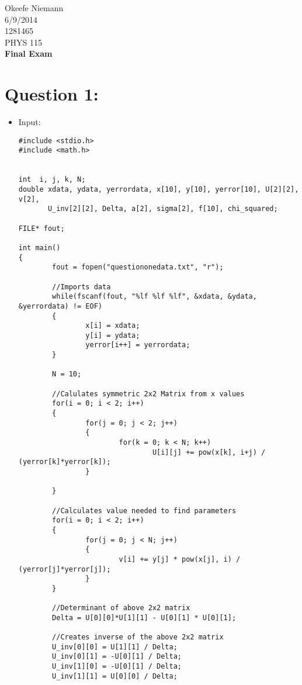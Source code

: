 \documentclass[10pt]{article}
\begin{document}
 
\begin{center}
\large
\hfill Okeefe Niemann\\
\hfill 6/9/2014\\
\hfill 1281465\\
\hfill PHYS 115 \\
\LARGE \textbf{Final Exam}\\
\end{center}
\normalsize
\section*{Question 1:}
\begin{itemize}
\item Input:
\begin{verbatim}
#include <stdio.h>
#include <math.h>


int  i, j, k, N;
double xdata, ydata, yerrordata, x[10], y[10], yerror[10], U[2][2], v[2], 
       U_inv[2][2], Delta, a[2], sigma[2], f[10], chi_squared;

FILE* fout;

int main()
{
        fout = fopen("questiononedata.txt", "r");
        
        //Imports data
        while(fscanf(fout, "%lf %lf %lf", &xdata, &ydata, &yerrordata) != EOF)
        {
                x[i] = xdata;
                y[i] = ydata;
                yerror[i++] = yerrordata;
        }
        
        N = 10;
        
        //Calulates symmetric 2x2 Matrix from x values
        for(i = 0; i < 2; i++)
        {
                for(j = 0; j < 2; j++)
                {
                        for(k = 0; k < N; k++)
                                U[i][j] += pow(x[k], i+j) / (yerror[k]*yerror[k]);
                }
                
        }
        
        //Calculates value needed to find parameters
        for(i = 0; i < 2; i++)
        {
                for(j = 0; j < N; j++)
                {
                        v[i] += y[j] * pow(x[j], i) / (yerror[j]*yerror[j]);
                }
        }
        
        //Determinant of above 2x2 matrix
        Delta = U[0][0]*U[1][1] - U[0][1] * U[0][1];
        
        //Creates inverse of the above 2x2 matrix
        U_inv[0][0] = U[1][1] / Delta;
        U_inv[0][1] = -U[0][1] / Delta;
        U_inv[1][0] = -U[0][1] / Delta;
        U_inv[1][1] = U[0][0] / Delta;
        

\end{verbatim}
\end{itemize}
\end{document}
